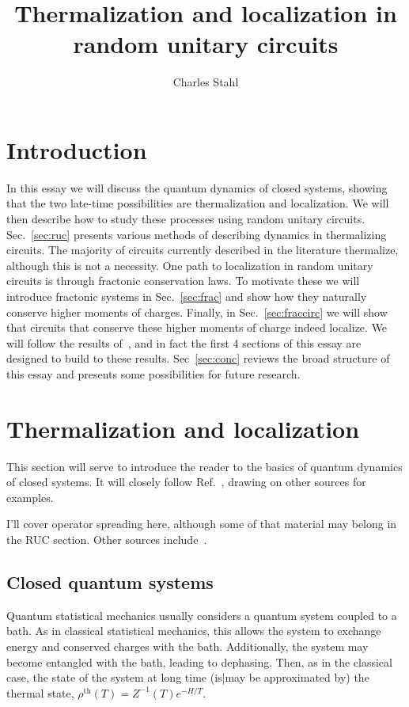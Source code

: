 \documentclass[a4paper,12pt]{article}
\title{Thermalization and localization in random unitary circuits}
\author{Charles Stahl}
\newcommand{\note}[1]{{\color{red}{#1}}}
\begin{document}
\maketitle

\section{Introduction} \label{sec:intro}

In this essay we will discuss the quantum dynamics of closed systems, showing that the two late-time possibilities are thermalization and localization. We will then describe how to study these processes using random unitary circuits. Sec.~\ref{sec:ruc} presents various methods of describing dynamics in thermalizing circuits. The majority of circuits currently described in the literature thermalize, although this is not a necessity. One path to localization in random unitary circuits is through fractonic conservation laws. To motivate these we will introduce fractonic systems in Sec.~\ref{sec:frac} and show how they naturally conserve higher moments of charges. Finally, in Sec.~\ref{sec:fraccirc} we will show that circuits that conserve these higher moments of charge indeed localize. We will follow the results of~\cite{PaiFracton}, and in fact the first 4 sections of this essay are designed to build to these results. Sec~\ref{sec:conc} reviews the broad structure of this essay and presents some possibilities for future research.

\note{Include term ``scrambling"}

\section{Thermalization and localization} \label{sec:therm}

This section will serve to introduce the reader to the basics of quantum dynamics of closed systems. It will closely follow Ref.~\cite{Nandkishore14}, drawing on other sources for examples.

I'll cover operator spreading here, although some of that material may belong in the RUC section. Other sources include~\cite{GogolinStatMech, PolkovnikovClosed, Cazalilla2010}.

\subsection{Closed quantum systems} \label{sub:closed}

Quantum statistical mechanics usually considers a quantum system coupled to a bath. As in classical statistical mechanics, this allows the system to exchange energy and conserved charges with the bath. Additionally, the system may become entangled with the bath, leading to dephasing. Then, as in the classical case, the state of the system at long time (is|may be approximated by) the thermal state, $\rho^{\text{th}}(T)=Z^{-1}(T)e^{-H/T}$. 
\end{document}
